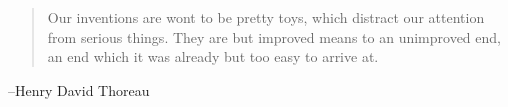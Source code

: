 \documentclass{exam}
\begin{document}
  \else
    \vspace{5 cm}

    \begin{quote}
      \begin{em}
        Our inventions are wont to be pretty toys, which distract our attention from serious things. They are but
        improved means to an unimproved end, an end which it was already but too easy to arrive at.
      \end{em}
    \end{quote}
    \hspace{1 cm} --Henry David Thoreau
  \fi
\end{document}

